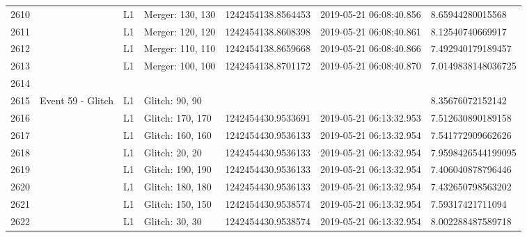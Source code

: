 \begin{longtable}{lllllll}
2610 &                                                    &       L1 &  Merger: 130, 130 &  1242454138.8564453 &  2019-05-21 06:08:40.856 &    8.65944280015568 \\
2611 &                                                    &       L1 &  Merger: 120, 120 &  1242454138.8608398 &  2019-05-21 06:08:40.861 &    8.12540740669917 \\
2612 &                                                    &       L1 &  Merger: 110, 110 &  1242454138.8659668 &  2019-05-21 06:08:40.866 &   7.492940179189457 \\
2613 &                                                    &       L1 &  Merger: 100, 100 &  1242454138.8701172 &  2019-05-21 06:08:40.870 &  7.0149838148036725 \\
2614 &                                                    &          &                   &                     &                          &                     \\
2615 &                                  Event 59 - Glitch &       L1 &    Glitch: 90, 90 &                     &                          &    8.35676072152142 \\
2616 &                                                    &       L1 &  Glitch: 170, 170 &  1242454430.9533691 &  2019-05-21 06:13:32.953 &   7.512630890189158 \\
2617 &                                                    &       L1 &  Glitch: 160, 160 &  1242454430.9536133 &  2019-05-21 06:13:32.954 &   7.541772909662626 \\
2618 &                                                    &       L1 &    Glitch: 20, 20 &  1242454430.9536133 &  2019-05-21 06:13:32.954 &  7.9598426544199095 \\
2619 &                                                    &       L1 &  Glitch: 190, 190 &  1242454430.9536133 &  2019-05-21 06:13:32.954 &   7.406040878796446 \\
2620 &                                                    &       L1 &  Glitch: 180, 180 &  1242454430.9536133 &  2019-05-21 06:13:32.954 &   7.432650798563202 \\
2621 &                                                    &       L1 &  Glitch: 150, 150 &  1242454430.9538574 &  2019-05-21 06:13:32.954 &    7.59317421711094 \\
2622 &                                                    &       L1 &    Glitch: 30, 30 &  1242454430.9538574 &  2019-05-21 06:13:32.954 &   8.002288487589718 \\

\end{longtable}
